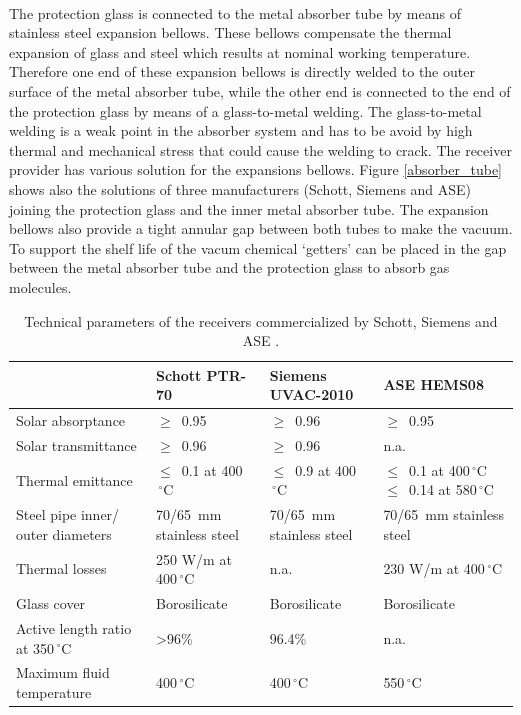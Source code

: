 \documentclass[Master,MEE,english]{twbook}%
\begin{document}
\\
The protection glass is connected to the metal absorber tube by means of stainless steel expansion bellows. These bellows compensate the thermal expansion of glass and steel which results at nominal working temperature. Therefore one end of these expansion bellows is directly welded to the outer surface of the metal absorber tube, while the other end is connected to the end of the protection glass by means of a glass-to-metal welding. The glass-to-metal welding is a weak point in the absorber system and has to be avoid by high thermal and mechanical stress that could cause the welding to crack. The receiver provider has various solution for the expansions bellows. Figure \ref{absorber_tube} shows also the solutions of three manufacturers (Schott, Siemens and ASE) joining the protection glass and the inner metal absorber tube. The expansion bellows also provide a tight annular gap between both tubes to make the vacuum. To support the shelf life of the vacum chemical ‘getters’ can be placed in the gap between the metal absorber tube and the protection glass to absorb gas molecules.
\begin{table}[!h]  
  \centering
	\begin{tabular}{  p{3.5cm}  C{3.5cm}  C{3.5cm}  C{3.5cm} } 
	
	\hline	
 & \textbf{Schott PTR-70} & \textbf{Siemens UVAC-2010} & \textbf{ASE HEMS08}\\ \hline \hline

Solar absorptance & $\ge$~0.95 & $\ge$~0.96 & $\ge$~0.95 \\ \hline
Solar transmittance & $\ge$~0.96 & $\ge$~0.96 & n.a. \\ \hline
Thermal emittance & $\le$~0.1 at 400$\,^{\circ}\mathrm{C}$  & $\le$~0.9 at 400$\,^{\circ}\mathrm{C}$& $\le$~0.1 at 400$\,^{\circ}\mathrm{C}$  $\le$~0.14 at 580$\,^{\circ}\mathrm{C}$\\ 
Steel pipe inner/ outer diameters & 70/65~mm stainless steel & 70/65~mm stainless steel & 70/65~mm stainless steel \\ \hline
Thermal losses & 250 W/m at 400$\,^{\circ}\mathrm{C}$ & n.a. & 230 W/m at 400$\,^{\circ}\mathrm{C}$ \\ \hline
Glass cover & Borosilicate & Borosilicate & Borosilicate\\ \hline
Active length ratio at 350$\,^{\circ}\mathrm{C}$ & >96\% & 96.4\% & n.a.\\ \hline
Maximum fluid temperature & 400$\,^{\circ}\mathrm{C}$ & 400$\,^{\circ}\mathrm{C}$ & 550$\,^{\circ}\mathrm{C}$\\ \hline
\end{tabular}
\caption[Technical parameters of the receivers commercialized by Schott, Siemens and ASE.]{Technical parameters of the receivers commercialized by Schott, Siemens and ASE \cite{Moya2012}.}\label{tbl: receiver_details}
\end{table}
\end{document}
